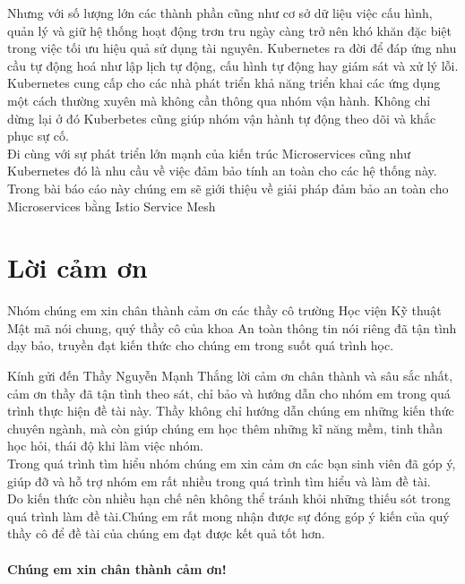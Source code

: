 \documentclass[12pt,a4paper]{report}
\begin{document}
Nhưng với số lượng lớn các thành phần cũng như cơ sở dữ liệu việc cấu hình, quản lý và giữ hệ thống hoạt động trơn tru ngày càng trở nên khó khăn đặc biệt trong việc tối ưu hiệu quả sử dụng tài nguyên. Kubernetes ra đời để đáp ứng nhu cầu tự động hoá như lập lịch tự động, cấu hình tự động hay giám sát và xử lý lỗi.\\

Kubernetes cung cấp cho các nhà phát triển khả năng triển khai các ứng dụng một cách thường xuyên mà không cần thông qua nhóm vận hành. Không chỉ dừng lại ở đó Kuberbetes cũng giúp nhóm vận hành tự động theo dõi và khắc phục sự cố. \\

Đi cùng với sự phát triển lớn mạnh của kiến trúc Microservices cũng như Kubernetes đó là nhu cầu về việc đảm bảo tính an toàn cho các hệ thống này. Trong bài báo cáo này chúng em sẽ giới thiệu về giải pháp đảm bảo an toàn cho Microservices bằng Istio Service Mesh
	
\chapter*{\centering Lời cảm ơn}
\hspace{0.6cm}Nhóm chúng em xin chân thành cảm ơn các thầy cô trường Học viện Kỹ thuật Mật mã nói chung, quý thầy cô của khoa An toàn thông tin nói riêng đã tận tình dạy bảo, truyền đạt kiến thức cho chúng em trong suốt quá trình học.\newline

Kính gửi đến Thầy Nguyễn Mạnh Thắng lời cảm ơn chân thành và sâu sắc nhất, cảm ơn thầy đã tận tình theo sát, chỉ bảo và hướng dẫn cho nhóm em trong quá trình thực hiện đề tài này. Thầy không chỉ hướng dẫn chúng em những kiến thức chuyên ngành, mà còn giúp chúng em học thêm những kĩ năng mềm, tinh thần học hỏi, thái độ khi làm việc nhóm.\\

Trong quá trình tìm hiểu nhóm chúng em xin cảm ơn các bạn sinh viên đã góp ý, giúp đỡ và hỗ trợ nhóm em rất nhiều trong quá trình tìm hiểu và làm đề tài.\\

Do kiến thức còn nhiều hạn chế nên không thể tránh khỏi những thiếu sót trong quá trình làm đề tài.Chúng em rất mong nhận được sự đóng góp ý kiến của quý thầy cô để đề tài của chúng em đạt được kết quả tốt hơn.\\
\medskip \\
\textbf{Chúng em xin chân thành cảm ơn!}
\end{document}
